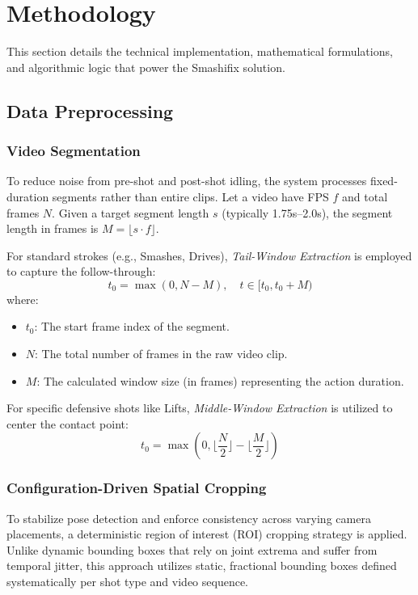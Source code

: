 \documentclass[pdflatex,sn-mathphys-num]{sn-jnl}%
\theoremstyle{thmstyleone}%
\theoremstyle{thmstyletwo}%
\theoremstyle{thmstylethree}%
\begin{document}

\section{Methodology}\label{sec4}

This section details the technical implementation, mathematical formulations, and algorithmic logic that power the Smashifix solution.

\subsection{Data Preprocessing}

\subsubsection{Video Segmentation}
To reduce noise from pre-shot and post-shot idling, the system processes fixed-duration segments rather than entire clips. Let a video have FPS $f$ and total frames $N$. Given a target segment length $s$ (typically 1.75s--2.0s), the segment length in frames is $M = \lfloor s \cdot f \rfloor$.

For standard strokes (e.g., Smashes, Drives), \textit{Tail-Window Extraction} is employed to capture the follow-through:
\begin{equation}
t_{0} = \max(0, N-M), \quad t \in [t_{0}, t_{0}+M)
\end{equation}
\noindent where:
\begin{itemize}
    \item $t_0$: The start frame index of the segment.
    \item $N$: The total number of frames in the raw video clip.
    \item $M$: The calculated window size (in frames) representing the action duration.
\end{itemize}

For specific defensive shots like Lifts, \textit{Middle-Window Extraction} is utilized to center the contact point:
\begin{equation}
t_{0} = \max(0, \lfloor \frac{N}{2} \rfloor - \lfloor \frac{M}{2} \rfloor)
\end{equation}

\subsubsection{Configuration-Driven Spatial Cropping}
To stabilize pose detection and enforce consistency across varying camera placements, a deterministic region of interest (ROI) cropping strategy is applied. Unlike dynamic bounding boxes that rely on joint extrema and suffer from temporal jitter, this approach utilizes static, fractional bounding boxes defined systematically per shot type and video sequence.
\end{document}
